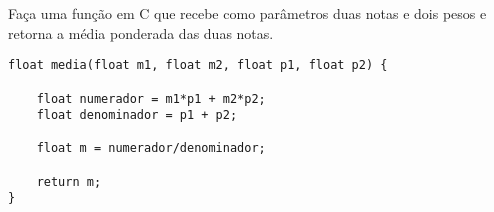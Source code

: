 
\question[10]

Faça uma função em C que recebe como parâmetros duas notas e dois pesos e retorna a média ponderada das duas notas.

\begin{solution}
\begin{lstlisting}
float media(float m1, float m2, float p1, float p2) {

	float numerador = m1*p1 + m2*p2;
	float denominador = p1 + p2;

	float m = numerador/denominador;
	
	return m;
}
\end{lstlisting}
\end{solution}
